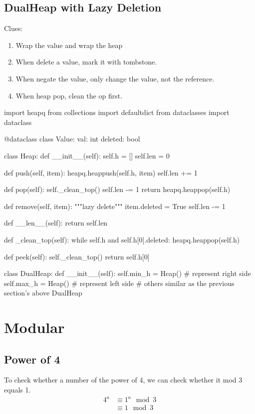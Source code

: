 \subsection{DualHeap with Lazy Deletion}\label{dh_lazy_del}
Clues:
\begin{enumerate}
\item Wrap the value and wrap the heap
\item When delete a value, mark it with tombstone. 
\item When negate the value, only change the value, not the reference. 
\item When heap pop, clean the op first. 
\end{enumerate}
\begin{python}
import heapq
from collections import defaultdict
from dataclasses import dataclass

@dataclass
class Value:
    val: int
    deleted: bool


class Heap:
    def __init__(self):
        self.h = []
        self.len = 0

    def push(self, item):
        heapq.heappush(self.h, item)
        self.len += 1

    def pop(self):
        self._clean_top()
        self.len -= 1
        return heapq.heappop(self.h)

    def remove(self, item):
        """lazy delete"""
        item.deleted = True
        self.len -= 1

    def __len__(self):
        return self.len

    def _clean_top(self):
        while self.h and self.h[0].deleted:
            heapq.heappop(self.h)

    def peek(self):
        self._clean_top()
        return self.h[0]


class DualHeap:
    def __init__(self):
        self.min_h = Heap()  # represent right side
        self.max_h = Heap()  # represent left side
    # others similar as the previous section's above DualHeap
\end{python}

\section{Modular}
\subsection{Power of 4}
To check whether a number of the power of 4, we can check whether it mod 3 equals 1.
\begin{align*}
4^a &\equiv 1^a\mod 3 \\
&\equiv 1 \mod 3
\end{align*}


